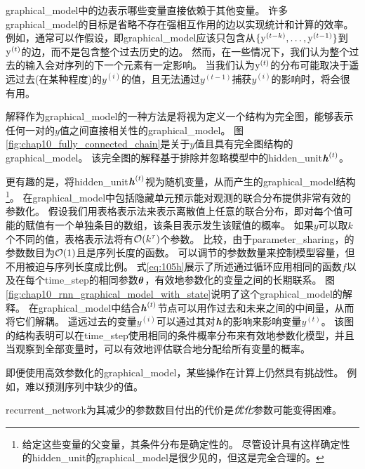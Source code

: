 \gls{graphical_model}中的边表示哪些变量直接依赖于其他变量。
许多\gls{graphical_model}的目标是省略不存在强相互作用的边以实现统计和计算的效率。
例如，通常可以作假设，即\gls{graphical_model}应该只包含从$\{ \mathrm{y}^{(t-k)}, \dots, \mathrm{y}^{(t-1)}\}$到$\mathrm{y}^{(t)}$的边，而不是包含整个过去历史的边。
然而，在一些情况下，我们认为整个过去的输入会对序列的下一个元素有一定影响。
当我们认为$\mathrm{y}^{(t)}$的分布可能取决于遥远过去(在某种程度)的$y^{(i)}$的值，且无法通过$y^{(t-1)}$捕获$y^{(i)}$的影响时，将会很有用。

解释作为\gls{graphical_model}的一种方法是将视为定义一个结构为完全图，能够表示任何一对的$y$值之间直接相关性的\gls{graphical_model}。
图\ref{fig:chap10_fully_connected_chain}是关于$y$值且具有完全图结构的\gls{graphical_model}。
该完全图的解释基于排除并忽略模型中的\gls{hidden_unit}$\boldsymbol{\mathit{h}}^{(t)}$。


更有趣的是，将\gls{hidden_unit}$\boldsymbol{\mathit{h}}^{(t)}$视为随机变量，从而产生的\gls{graphical_model}结构\footnote{给定这些变量的父变量，其条件分布是确定性的。
尽管设计具有这样确定性的\gls{hidden_unit}的\gls{graphical_model}是很少见的，但这是完全合理的。}。
在\gls{graphical_model}中包括隐藏单元预示能对观测的联合分布提供非常有效的参数化。
假设我们用表格表示法来表示离散值上任意的联合分布，即对每个值可能的赋值有一个单独条目的数组，该条目表示发生该赋值的概率。
如果$y$可以取$k$个不同的值，表格表示法将有$\mathcal{O}(k^\tau)$个参数。
比较，由于\gls{parameter_sharing}，的参数数目为$\mathcal{O}(1)$且是序列长度的函数。
可以调节的参数数量来控制模型容量，但不用被迫与序列长度成比例。
式\eqref{eq:105h}展示了所述通过循环应用相同的函数$f$以及在每个\gls{time_step}的相同参数$\boldsymbol{\theta}$，有效地参数化的变量之间的长期联系。
图\ref{fig:chap10_rnn_graphical_model_with_state}说明了这个\gls{graphical_model}的解释。
在\gls{graphical_model}中结合$\boldsymbol{\mathit{h}}^{(t)}$节点可以用作过去和未来之间的中间量，从而将它们解耦。
遥远过去的变量$y^{(i)}$可以通过其对$\boldsymbol{\mathit{h}}$的影响来影响变量$y^{(t)}$。
该图的结构表明可以在\gls{time_step}使用相同的条件概率分布来有效地参数化模型，并且当观察到全部变量时，可以有效地评估联合地分配给所有变量的概率。


即便使用高效参数化的\gls{graphical_model}，某些操作在计算上仍然具有挑战性。
例如，难以预测序列中缺少的值。

\gls{recurrent_network}为其减少的参数数目付出的代价是\emph{优化}参数可能变得困难。

